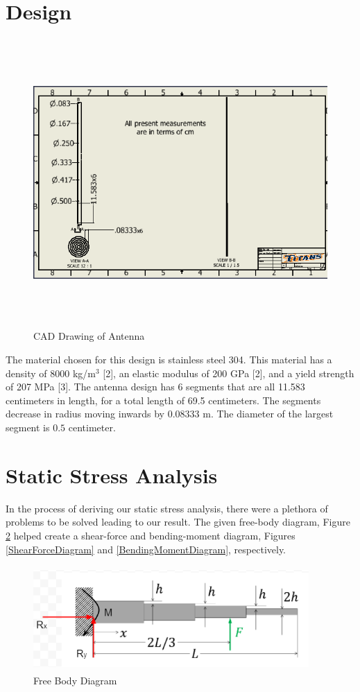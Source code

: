 \documentclass[12pt]{article}
\begin{document}
\section{Design}

\begin{figure}[H]
\centering
\includegraphics[height= 11cm, width= 15cm]{Antenna.png}
\caption{CAD Drawing of Antenna}
\label{CadDrawingAntenna}
\end{figure}

The material chosen for this design is stainless steel 304. This material has a density of 8000 kg/m$^3$ [2], an elastic modulus of 200 GPa [2], and a yield strength of 207 MPa [3]. The antenna design has 6 segments that are all 11.583 centimeters in length, for a total length of 69.5 centimeters. The segments decrease in radius moving inwards by 0.08333 m. The diameter of the largest segment is $0.5$ centimeter.
\newpage

\section{Static Stress Analysis}
In the process of deriving our static stress analysis, there were a plethora of problems to be solved leading to our result. The given free-body diagram, Figure \ref{FreeBodyDiagram} helped create a shear-force and bending-moment diagram, Figures \ref{ShearForceDiagram} and \ref{BendingMomentDiagram}, respectively.

\begin{figure}[H]
\centering
\includegraphics[height= 4cm, width= 10.5cm]{freebody.png}
\caption{Free Body Diagram}
\label{FreeBodyDiagram}
\end{figure}
\end{document}
